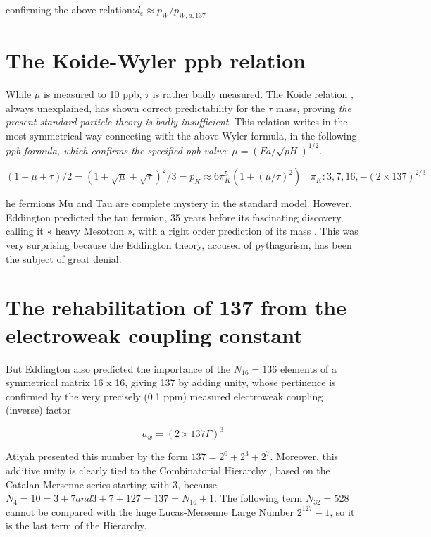 \documentclass[a4paper,9pt]{article}
\begin{document}
confirming the above relation:$d_e \approx p_W /p_{W, a, 137}$







\section {The Koide-Wyler ppb relation}

While $\mu$ is measured to 10 ppb, $\tau$ is rather badly measured. The Koide relation \cite{Koide}, always unexplained, has shown correct predictability for the $\tau$ mass, proving \textit{the present standard particle theory is badly insufficient}. This relation writes in the most symmetrical way connecting with the above Wyler formula, in the following \textit{ppb formula, which confirms the specified ppb value}: $\mu = (Fa/\sqrt{pH})^{1/2}$\cite{Sanchez}.


\begin{equation}
(1 + \mu + \tau)/2 = (1 + \sqrt{\mu} + \sqrt{\tau})^2/3 = p_K \approx 6\pi_K^5 (1+(\mu / \tau)^2) ~~~~\pi_K: 3,7,16,-(2\times 137)^{2/3}
\end{equation}

he fermions Mu and Tau are complete mystery in the standard model. However, Eddington predicted the tau fermion, 35 years before its fascinating discovery, calling it « heavy Mesotron », with a right order prediction of its mass \cite{Eddington}.  This was very surprising because the Eddington theory, accused of pythagorism, has been the subject of great denial.

\section{The rehabilitation of 137 from the electroweak coupling constant}

But Eddington also predicted the importance of the $N_{16} = 136$ elements of a symmetrical matrix 16 x 16, giving 137 by adding unity, whose pertinence is confirmed by the very precisely (0.1 ppm) measured electroweak coupling (inverse) factor 

\begin{equation}
a_w = (2\times137 \Gamma)^3
\end{equation}
 
Atiyah presented this number by the form $137 = 2^0 + 2^3 + 2^7$. Moreover, this additive unity is clearly tied to the Combinatorial Hierarchy \cite{Bastin}, based on the Catalan-Mersenne series starting with 3, because $N_4 = 10 = 3 + 7 and 3+7 + 127 = 137 = N_{16} + 1$. The following term $N_{32}  = 528$ cannot be compared with the huge Lucas-Mersenne Large Number $2^{127}- 1$, so it is the last term of the Hierarchy. 
\end{document}
